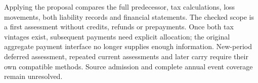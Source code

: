 Applying the proposal compares the full predecessor, tax calculations, loss
movements, both liability records and financial statements. The checked scope
is a first assessment without credits, refunds or prepayments. Once both tax
vintages exist, subsequent payments need explicit allocation; the original
aggregate payment interface no longer supplies enough information. New-period
deferred assessment, repeated current assessments and later carry require their
own compatible methods. Source admission and complete annual event coverage
remain unresolved.

